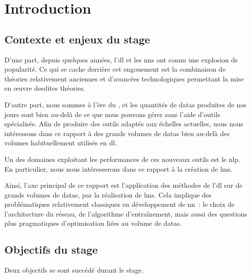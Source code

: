 \chapter{Introduction}

\section[Contexte \& Enjeux]{Contexte et enjeux du stage}

D'une part, depuis quelques années, l'\gls{dl} et les \glspl{nn} ont connu une explosion de popularité.
Ce qui se cache derrière cet engouement est la combinaison de théories relativement anciennes et d'avancées technologiques permettant la mise en œuvre desdites théories.

D'autre part, nous sommes à l'ère du , et les quantités de \glspl{data} produites de nos jours sont bien au-delà de ce que nous pouvons gérer sans l'aide d'outils spécialisés.
Afin de produire des outils adaptés aux échelles actuelles, nous nous intéressons dans ce rapport à des grands volumes de \glspl{data} bien au-delà des volumes habituellement utilisés en \gls{dl}.

Un des domaines exploitant les performances de ces nouveaux outils est le \gls{nlp}.
En particulier, nous nous intéresserons dans ce rapport à la création de \glspl{lm}.

Ainsi, l'axe principal de ce rapport est l'application des méthodes de l'\gls{dl} sur de grands volumes de \glspl{data}, par la réalisation de \glspl{lm}.
Cela implique des problématiques relativement classiques en développement de \gls{nn}~: le choix de l'architecture du réseau, de l'algorithme d'entraînement, mais aussi des questions plus pragmatiques d'optimisation liées au volume de \glspl{data}.

\newpage
\section[Objectifs]{Objectifs du stage}
Deux objectifs se sont succédé durant le stage.

